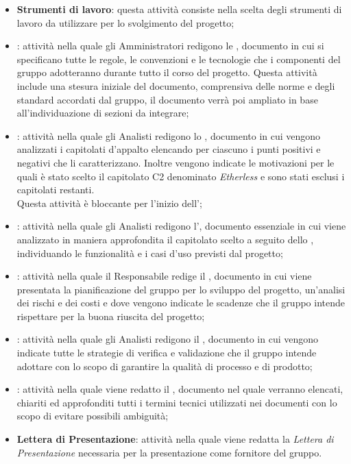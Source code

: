 \begin{itemize}
	\item \textbf{Strumenti di lavoro}: questa attività consiste nella scelta degli strumenti di lavoro da utilizzare per lo svolgimento del progetto;
	\item \textbf{\NdP{}}: attività nella quale gli Amministratori redigono le \textit{\NdP{}}, documento in cui si specificano tutte le regole, le convenzioni e le tecnologie che i componenti del gruppo adotteranno durante tutto il corso del progetto. Questa attività include una stesura iniziale del documento, comprensiva delle norme e degli standard accordati dal gruppo, il documento verrà poi ampliato in base all'individuazione di sezioni da integrare;
	\item \textbf{\SdF{}}: attività nella quale gli Analisti redigono lo \textit{\SdF}, documento in cui vengono analizzati i capitolati d'appalto elencando per ciascuno i punti positivi e negativi che li caratterizzano. Inoltre vengono indicate le motivazioni per le quali è stato scelto il capitolato C2 denominato \textit{Etherless} e sono stati esclusi i capitolati restanti. \\
	Questa attività è bloccante per l'inizio dell'\textit{\AdR{}};
	\item \textbf{\AdR{}}: attività nella quale gli Analisti redigono l'\textit{\AdR{}}, documento essenziale in cui viene analizzato in maniera approfondita il capitolato scelto a seguito dello \textit{\SdF}, individuando le funzionalità e i casi d'uso previsti dal progetto;
	\item \textbf{\PdP{}}: attività nella quale il Responsabile redige il \textit{\PdP}, documento in cui viene presentata la pianificazione del gruppo per lo sviluppo del progetto, un'analisi dei rischi e dei costi e dove vengono indicate le scadenze che il gruppo intende rispettare per la buona riuscita del progetto;
	\item \textbf{\PdQ{}}: attività nella quale gli Analisti redigono il \textit{\PdQ}, documento in cui vengono indicate tutte le strategie di verifica e validazione che il gruppo intende adottare con lo scopo di garantire la qualità di processo e di prodotto;
	\item \textbf{\Glossario{}}: attività nella quale viene redatto il \textit{\Glossario}, documento nel quale verranno elencati, chiariti ed approfonditi tutti i termini tecnici utilizzati nei documenti con lo scopo di evitare possibili ambiguità;
	\item \textbf{Lettera di Presentazione}: attività nella quale viene redatta la \textit{Lettera di Presentazione} necessaria per la presentazione come fornitore del gruppo.
\end{itemize}
